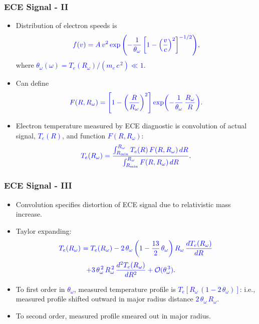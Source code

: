 \documentclass{beamer}
\begin{document}
\begin{frame}
\frametitle{ECE Signal - II}
 
\begin{itemize}
 \item Distribution of electron speeds is
$$
\textcolor{blue}{f(v)= A\,v^2\,{\rm exp}\left(-\frac{1}{\theta_\omega}\left[1-\left(\frac{v}{c}\right)^2\right]^{-1/2}\right)},
$$
where
\textcolor{blue}{$\theta_\omega(\omega) = T_e(R_\omega)/(m_e\,c^{\,2})\ll 1$}. 

\item Can define 
$$
\textcolor{blue}{F(R,R_\omega) = \left[1-\left(\frac{R}{R_\omega}\right)^2\right]\exp\!\left(-\frac{1}{\theta_\omega}\,\frac{R_\omega}{R}\right)}.
$$

\item Electron temperature measured by  ECE diagnostic is  convolution of actual signal, \textcolor{blue}{$T_e(R)$},  and function \textcolor{blue}{$F(R,R_\omega)$}:
$$
\textcolor{blue}{T_e(R_\omega) = \frac{\int_{R_{\rm min}}^{R_\omega} T_e(R)\,F(R,R_\omega)\,dR}  {\int_{R_{\rm min}}^{R_\omega} F(R,R_\omega)\,dR}}.
$$
 \end{itemize}
 \end{frame}
 
 \begin{frame}
\frametitle{ECE Signal - III}
 
\begin{itemize}
\item Convolution specifies distortion of ECE signal due to relativistic mass increase. 
\item Taylor expanding: 
\begin{align*}
\textcolor{blue}{T_e(R_\omega)}&\textcolor{blue}{~= T_e(R_\omega) - 2\,\theta_\omega\left(1-\frac{13}{2}\,\theta_\omega\right) R_\omega\,\frac{d T_e(R_\omega)}{dR}}\\[0.5ex]
&\phantom{=}\textcolor{blue}{+ 3\,\theta_\omega^{\,2}\,R_\omega^{\,2}\,
\frac{d^2 T_e(R_\omega)}{dR^2} + {\cal O}(\theta_\omega^{\,3})}.
\end{align*}
\item To first order  in \textcolor{blue}{$\theta_\omega$}, 
measured temperature profile is \textcolor{blue}{$T_e[R_\omega\,(1-2\,\theta_\omega)]$}: i.e.,  measured profile shifted outward in major radius 
distance \textcolor{blue}{$2\,\theta_\omega\,R_\omega$}. 
\item To second order,  measured profile  smeared out in major radius. 
\end{itemize}
\end{frame}
\end{document}
